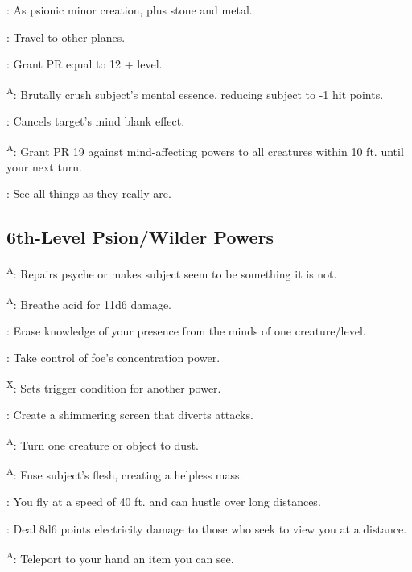 : As psionic minor creation, plus stone and metal.

: Travel to other planes.

: Grant PR equal to 12 + level.

\textsuperscript{A}: Brutally crush subject’s mental essence, reducing subject to -1 hit points.

: Cancels target’s mind blank effect.

\textsuperscript{A}: Grant PR 19 against mind-affecting powers to all creatures within 10 ft. until your next turn.

: See all things as they really are.




\subsection{6th-Level Psion/Wilder Powers}

\textsuperscript{A}: Repairs psyche or makes subject seem to be something it is not.

\textsuperscript{A}: Breathe acid for 11d6 damage.

: Erase knowledge of your presence from the minds of one creature/level.

: Take control of foe’s concentration power.

\textsuperscript{X}: Sets trigger condition for another power.

: Create a shimmering screen that diverts attacks.

\textsuperscript{A}: Turn one creature or object to dust.

\textsuperscript{A}: Fuse subject’s flesh, creating a helpless mass.

: You fly at a speed of 40 ft. and can hustle over long distances.

: Deal 8d6 points electricity damage to those who seek to view you at a distance.

\textsuperscript{A}: Teleport to your hand an item you can see.


